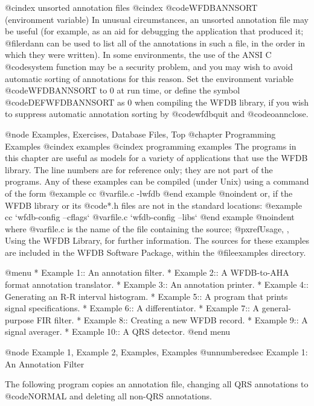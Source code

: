 {{{{{{{{{@cindex unsorted annotation files
@cindex @code{WFDBANNSORT} (environment variable)
In unusual circumstances, an unsorted annotation file may be useful (for
example, as an aid for debugging the application that produced it; @file{rdann}
can be used to list all of the annotations in such a file, in the order in
which they were written).  In some environments, the use of the ANSI C
@code{system} function may be a security problem, and you may wish to avoid
automatic sorting of annotations for this reason.  Set the environment variable
@code{WFDBANNSORT} to 0 at run time, or define the symbol @code{DEFWFDBANNSORT}
as 0 when compiling the WFDB library, if you wish to suppress automatic
annotation sorting by @code{wfdbquit} and @code{oannclose}.

@node Examples, Exercises, Database Files, Top
@chapter Programming Examples
@cindex examples
@cindex programming examples
The programs in this chapter are useful as models for a variety of
applications that use the WFDB library.  The line numbers are for
reference only; they are not part of the programs.  Any of these
examples can be compiled (under Unix) using a command of the form
@example
cc @var{file.c} -lwfdb
@end example
@noindent
or, if the WFDB library or its @code{*.h} files are not in the standard
locations:
@example
cc `wfdb-config --cflags` @var{file.c} `wfdb-config --libs`
@end example
@noindent
where @var{file.c} is the name of the file containing the source;
@pxref{Usage, , Using the WFDB Library}, for further information.
The sources for these examples are included in the WFDB Software Package,
within the @file{examples} directory.

@menu
* Example 1::			An annotation filter.
* Example 2::			A WFDB-to-AHA format annotation translator.
* Example 3::			An annotation printer.
* Example 4::			Generating an R-R interval histogram.
* Example 5::			A program that prints signal specifications.
* Example 6::			A differentiator.
* Example 7::			A general-purpose FIR filter.
* Example 8::			Creating a new WFDB record.
* Example 9::			A signal averager.
* Example 10::			A QRS detector.
@end menu

@node     Example 1, Example 2, Examples, Examples
@unnumberedsec Example 1:  An Annotation Filter

The following program copies an annotation file, changing all QRS annotations
to @code{NORMAL} and deleting all non-QRS annotations.

}}}}}}}}}
